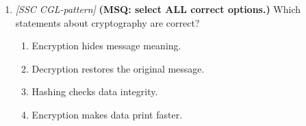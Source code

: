\documentclass[11pt]{article}
\begin{document}
\begin{enumerate}[label=\textbf{Q\arabic*.}, leftmargin=*]
  \begin{enumerate}[label=\Alph*.]
    \item Same key encrypts and decrypts
    \item AES cipher
    \item Fast bulk-data encryption
    \item Public-private key pairs
  \end{enumerate}
\item \textit{[SSC CGL-pattern]} \textbf{(MSQ: select ALL correct options.)} Which statements about cryptography are correct?
  \begin{enumerate}[label=\Alph*.]
    \item Encryption hides message meaning.
    \item Decryption restores the original message.
    \item Hashing checks data integrity.
    \item Encryption makes data print faster.
  \end{enumerate}
\end{enumerate}
\def\JKSSBLessonID{64}\def\JKSSBAnswers{0}
\end{document}
